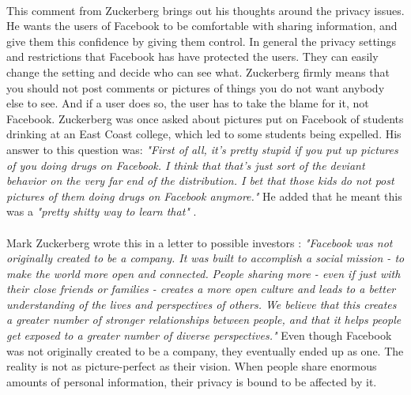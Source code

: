 \paragraph{}
This comment from Zuckerberg brings out his thoughts around the privacy issues. He wants the users of Facebook to be comfortable with sharing information, and give them this confidence by giving them control. In general the privacy settings and restrictions that Facebook has have protected the users. They can easily change the setting and decide who can see what. Zuckerberg firmly means that you should not post comments or pictures of things you do not want anybody else to see. And if a user does so, the user has to take the blame for it, not Facebook. Zuckerberg was once asked about pictures put on Facebook of students drinking at an East Coast college, which led to some students being expelled. His answer to this question was: \textit{"First of all, it's pretty stupid if you put up pictures of you doing drugs on Facebook. I think that that's just sort of the deviant behavior on the very far end of the distribution. I bet that those kids do not post pictures of them doing drugs on Facebook anymore."} He added that he meant this was a \textit{"pretty shitty way to learn that"} \cite{MeMedia}.

\paragraph{}
Mark Zuckerberg wrote this in a letter to possible investors \cite{LetterToInvestors}: \textit{"Facebook was not originally created to be a company. It was built to accomplish a social mission - to make the world more open and connected.} \textit{People sharing more - even if just with their close friends or families - creates a more open culture and leads to a better understanding of the lives and perspectives of others. We believe that this creates a greater number of stronger relationships between people, and that it helps people get exposed to a greater number of diverse perspectives."} Even though Facebook was not originally created to be a company, they eventually ended up as one. The reality is not as picture-perfect as their vision. When people share enormous amounts of personal information, their privacy is bound to be affected by it. 